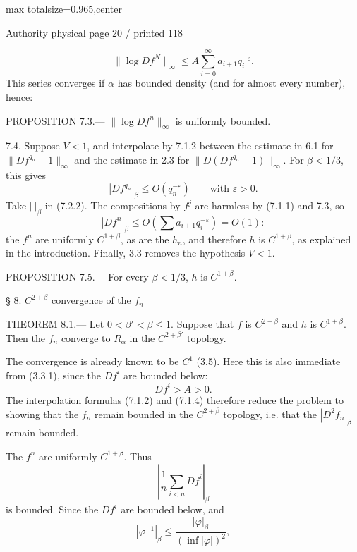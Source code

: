 \documentclass{article}
\begin{document}
\newpage
\noindent\begin{adjustbox}{max totalsize={\textwidth}{0.965\textheight},center}\begin{minipage}{\textwidth}
\noindent\hfill\scriptsize Authority physical page 20 / printed 118\par\normalsize
\[
\tag{7.2.3}
\lVert\log Df^N\rVert_\infty
\leq A\sum_{i=0}^{\infty}a_{i+1}q_i^{-\varepsilon}.
\]
This series converges if \(\alpha\) has bounded density (and for almost every number), hence:

PROPOSITION 7.3.— \(\lVert\log Df^n\rVert_\infty\) is uniformly bounded.

7.4. Suppose \(V<1\), and interpolate by 7.1.2 between the estimate in 6.1 for \(\lVert Df^{q_n}-1\rVert_\infty\) and the estimate in 2.3 for \(\lVert D(Df^{q_n}-1)\rVert_\infty\). For \(\beta<1/3\), this gives
\[
\tag{7.4.1}
|Df^{q_n}|_\beta\leq O(q_n^{-\varepsilon})
\qquad\text{with }\varepsilon>0.
\]
Take \(|\ |_{\beta}\) in (7.2.2). The compositions by \(f^j\) are harmless by (7.1.1) and 7.3, so
\[
|Df^n|_\beta\leq O\!\left(\sum a_{i+1}q_i^{-\varepsilon}\right)=O(1):
\]
the \(f^n\) are uniformly \(C^{1+\beta}\), as are the \(h_n\), and therefore \(h\) is \(C^{1+\beta}\), as explained in the introduction. Finally, 3.3 removes the hypothesis \(V<1\).

PROPOSITION 7.5.— For every \(\beta<1/3\), \(h\) is \(C^{1+\beta}\).

§ 8. \(C^{2+\beta}\) convergence of the \(f_n\)

THEOREM 8.1.— Let \(0<\beta'<\beta\leq1\). Suppose that \(f\) is \(C^{2+\beta}\) and \(h\) is \(C^{1+\beta}\). Then the \(f_n\) converge to \(R_\alpha\) in the \(C^{2+\beta'}\) topology.

The convergence is already known to be \(C^1\) (3.5). Here this is also immediate from (3.3.1), since the \(Df^i\) are bounded below:
\[
Df^i>A>0.
\]
The interpolation formulas (7.1.2) and (7.1.4) therefore reduce the problem to showing that the \(f_n\) remain bounded in the \(C^{2+\beta}\) topology, i.e. that the \(|D^2f_n|_\beta\) remain bounded.

The \(f^n\) are uniformly \(C^{1+\beta}\). Thus
\[
\left|\frac1n\sum_{i<n}Df^i\right|_\beta
\]
is bounded. Since the \(Df^i\) are bounded below, and
\[
|\varphi^{-1}|_\beta\leq\frac{|\varphi|_\beta}{(\inf|\varphi|)^2},
\]
\end{minipage}\end{adjustbox}
\end{document}
